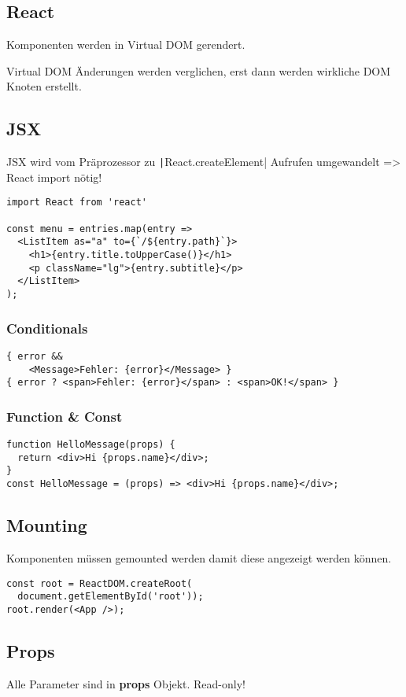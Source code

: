 \begin{multicols*}{2}
\section{React}

Komponenten werden in Virtual DOM gerendert.

Virtual DOM Änderungen werden verglichen, erst dann werden wirkliche DOM Knoten erstellt.

\subsection{JSX}
JSX wird vom Präprozessor zu \texttt|React.createElement| Aufrufen umgewandelt => React import nötig!
\begin{verbatim}
import React from 'react'

const menu = entries.map(entry =>
  <ListItem as="a" to={`/${entry.path}`}>
    <h1>{entry.title.toUpperCase()}</h1>
    <p className="lg">{entry.subtitle}</p>
  </ListItem>
);
\end{verbatim}

\subsubsection{Conditionals}
\begin{verbatim}
{ error &&
    <Message>Fehler: {error}</Message> }
{ error ? <span>Fehler: {error}</span> : <span>OK!</span> }
\end{verbatim}

\subsubsection{Function \& Const}
\begin{verbatim}
function HelloMessage(props) {
  return <div>Hi {props.name}</div>;
}
const HelloMessage = (props) => <div>Hi {props.name}</div>;
\end{verbatim}

\subsection{Mounting}
Komponenten müssen gemounted werden damit diese angezeigt werden können.
\begin{verbatim}
const root = ReactDOM.createRoot(
  document.getElementById('root'));
root.render(<App />);
\end{verbatim}

\subsection{Props}
Alle Parameter sind in \textbf{props} Objekt. Read-only!


\end{multicols*}
